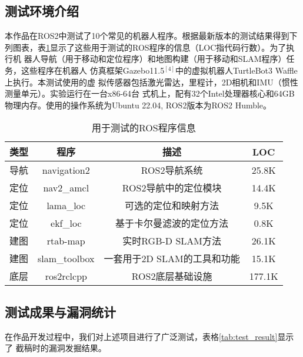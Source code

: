\subsection{测试环境介绍}
本作品在ROS2中测试了10个常见的机器人程序。根据最新版本的测试结果得到下列图表，表\ref{tb:ros_test}显示了这些用于测试的ROS程序的信息（LOC指代码行数）。为了执行机
器人导航（用于移动和定位程序）和地图构建（用于移动和SLAM程序）任务，这些程序在机器人
仿真框架Gazebo11.5$^{[4]}$中的虚拟机器人TurtleBot3 Waffle上执行。本测试使用的虚
拟传感器包括激光雷达，里程计，2D相机和IMU（惯性测量单元）。实验运行在一台x86-64台
式机上，配有32个Intel处理器核心和64GB物理内存。使用的操作系统为Ubuntu 22.04,
ROS2版本为ROS2 Humble。
\begin{table}[H]
	\small
	\caption{用于测试的ROS程序信息}
	\label{tb:ros_test}
	\centering
	\begin{tabular}{cccc}
		\hline  
		\textbf{类型} & \textbf{程序} & \textbf{描述} & \textbf{LOC} \\ 
		\hline  
    导航 & navigation2 & ROS2导航系统 & 25.8K \\
		定位 & nav2\_amcl & ROS2导航中的定位模块 & 14.4K \\
		定位 & lama\_loc & 可选的定位和映射方法 & 9.5K \\
		定位 & ekf\_loc & 基于卡尔曼滤波的定位方法 & 0.8K \\
		建图 & rtab-map & 实时RGB-D SLAM方法 & 26.1K \\
		建图 & slam\_toolbox & 一套用于2D SLAM的工具和功能 & 15.1K \\
    底层 & ros2rclcpp & ROS2底层基础设施 & 177.1K \\
		\hline
	\end{tabular} 
\end{table}

\subsection{测试成果与漏洞统计}
在作品开发过程中，我们对上述项目进行了广泛测试，表格\ref{tab:test_result}显示了
截稿时的漏洞发掘结果。

